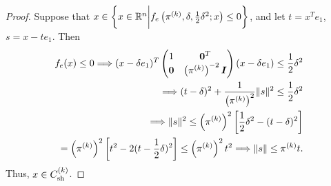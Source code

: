 \begin{proof}
Suppose that $x \in \left\{x \in \mathbb R^n \bigg| f_e\left(\pi^{(k)}, \delta, \frac 1 2 \delta^2; x\right) \le 0 \right\}$, 
and let $t = x^Te_1$, $s=x - t e_1$. 
Then
\begin{align*}
f_e(x) \le 0 \Longrightarrow 
(x - \delta e_1)^T\begin{pmatrix}
1 & \boldsymbol0^T \\
\boldsymbol 0 & \left(\pi^{(k)}\right)^{-2} \boldsymbol I \\
\end{pmatrix}(x - \delta e_1) \le \frac 1 2 \delta^2  \\
\Longrightarrow (t - \delta)^2 + \frac {1} {\left(\pi^{(k)}\right)^2} \|s\|^2 \le \frac 1 2 \delta^2 \\
\Longrightarrow \|s\|^2 \le \left(\pi^{(k)}\right)^2 \left[\frac 1 2 \delta^2 - (t - \delta)^2\right] \\
= \left(\pi^{(k)}\right)^2 \left[t^2 - 2(t - \frac 1 2 \delta)^2 \right] \le \left(\pi^{(k)}\right)^2t^2
\Longrightarrow \|s\| \le \pi^{(k)} t.
\end{align*}
Thus, $x \in{C^{(k)}_{\textrm{sh}}}$.
\end{proof}



